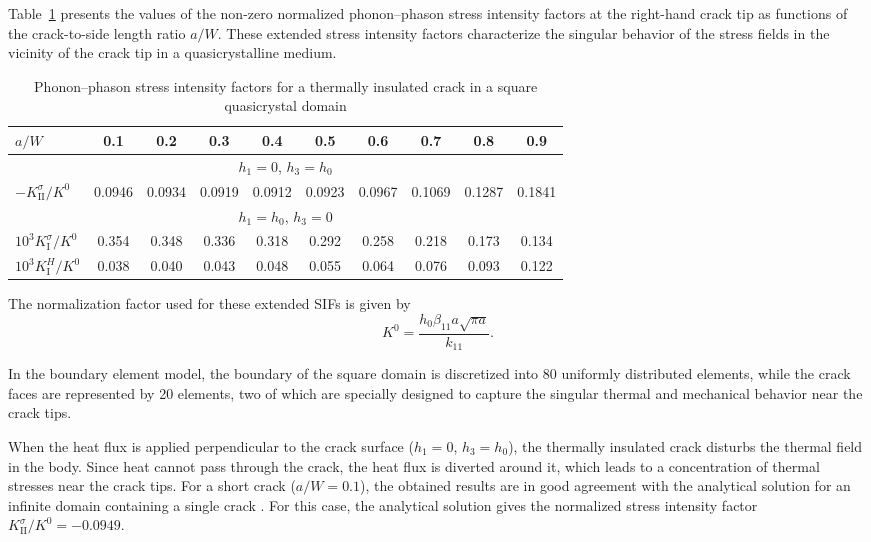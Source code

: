 Table~\ref{KushnirTab2} presents the values of the non-zero normalized
phonon–phason stress intensity factors at the right-hand crack tip
as functions of the crack-to-side length ratio $a/W$. These extended
stress intensity factors characterize the singular behavior of the
stress fields in the vicinity of the crack tip in a quasicrystalline
medium.

\begin{table}[h]
	\caption{Phonon--phason stress intensity factors for a thermally insulated crack
		in a square quasicrystal domain}
	\label{KushnirTab2}
	
	\centering
	\begin{tabular*}{\textwidth}{@{\extracolsep{\fill}}lccccccccc}
		\toprule
		${a/W}$ 
		& 0.1 & 0.2 & 0.3 & 0.4 & 0.5 & 0.6 & 0.7 & 0.8 & 0.9 \\
		\midrule
		
		\multicolumn{10}{c}{$h_{1}=0$, $h_{3}=h_{0}$} \\
		
		$-{K_{\mathrm{II}}^{\sigma}/K^{0}}$
		& 0.0946 & 0.0934 & 0.0919 & 0.0912 & 0.0923 & 0.0967 & 0.1069 & 0.1287 & 0.1841 \\
		
		\midrule
		
		\multicolumn{10}{c}{$h_{1}=h_{0}$, $h_{3}=0$} \\
		
		$10^{3}{K_{\mathrm{I}}^{\sigma}/K^{0}}$
		& 0.354 & 0.348 & 0.336 & 0.318 & 0.292 & 0.258 & 0.218 & 0.173 & 0.134 \\
		
		$10^{3}{K_{\mathrm{I}}^{H}/K^{0}}$
		& 0.038 & 0.040 & 0.043 & 0.048 & 0.055 & 0.064 & 0.076 & 0.093 & 0.122 \\
		
		\bottomrule
	\end{tabular*}
\end{table}

The normalization factor used for these extended SIFs is given by
\[
K^{0}=\frac{h_{0}\beta_{11}a\sqrt{\pi a}}{k_{11}}.
\]

In the boundary element model, the boundary of the square domain is
discretized into 80 uniformly distributed elements, while the crack
faces are represented by 20 elements, two of which are specially
designed to capture the singular thermal and mechanical behavior near
the crack tips.



When the heat flux is applied perpendicular to the crack surface
($h_{1}=0$, $h_{3}=h_{0}$), the thermally insulated crack disturbs
the thermal field in the body. Since heat cannot pass through the
crack, the heat flux is diverted around it, which leads to a
concentration of thermal stresses near the crack tips. For a short
crack ($a/W=0.1$), the obtained results are in good agreement with
the analytical solution for an infinite domain containing a single
crack \cite{Kushnir34}. For this case, the analytical solution gives
the normalized stress intensity factor
$K_{\mathrm{II}}^{\sigma}/K^{0}=-0.0949$.

